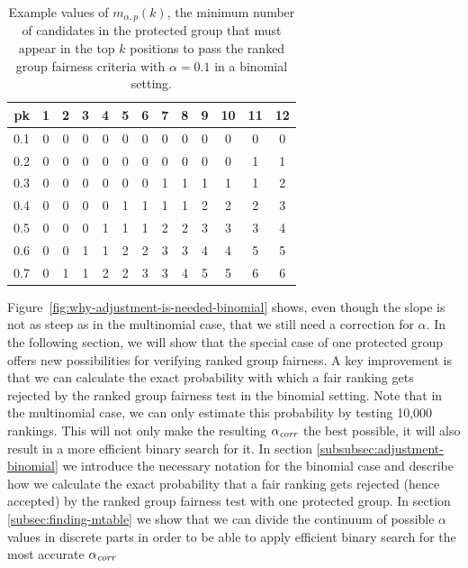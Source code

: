 \begin{table}[t!]
	\caption{Example values of $m_{\alpha,p}(k)$, the minimum number of candidates in the protected group that must appear in the top $k$ positions to pass the ranked group fairness criteria with $\alpha=0.1$ in a binomial setting.}
	\vspace{-3mm}
	\label{tbl:ranked_group_fairness_table}
	\small\begin{tabular}{r|cccccccccccc}
		\diaghead{some text}%
		{p}{k}&
		1 & 2 & 3 & 4 & 5 & 6 & 7 & 8 & 9 & 10 & 11 & 12 \\ \midrule
		0.1      & 0 & 0 & 0 & 0 & 0 & 0 & 0 & 0 & 0 & 0  &  0 &  0 \\
		0.2      & 0 & 0 & 0 & 0 & 0 & 0 & 0 & 0 & 0 & 0  &  1 &  1 \\
		0.3      & 0 & 0 & 0 & 0 & 0 & 0 & 1 & 1 & 1 & 1  &  1 &  2 \\
		0.4      & 0 & 0 & 0 & 0 & 1 & 1 & 1 & 1 & 2 & 2  &  2 &  3 \\
		0.5      & 0 & 0 & 0 & 1 & 1 & 1 & 2 & 2 & 3 & 3  &  3 &  4 \\
		0.6      & 0 & 0 & 1 & 1 & 2 & 2 & 3 & 3 & 4 & 4  &  5 &  5 \\
		0.7      & 0 & 1 & 1 & 2 & 2 & 3 & 3 & 4 & 5 & 5  &  6 &  6 \\
		\bottomrule
	\end{tabular}
\end{table}

Figure~\ref{fig:why-adjustment-is-needed-binomial} shows, even though the slope is not as steep as in the multinomial case, that we still need a correction for $\alpha$.
%
In the following section, we will show that the special case of one protected group offers new possibilities for verifying ranked group fairness. A key improvement is that we can calculate the exact probability with which a fair ranking gets rejected by the ranked group fairness test in the binomial setting. Note that in the multinomial case, we can only estimate this probability by testing 10,000 rankings. This will not only make the resulting $\alpha_\textit{corr}$ the best possible, it will also result in a more efficient binary search for it. 
%
In section \ref{subsubsec:adjustment-binomial} we introduce the necessary notation for the binomial case and describe how we calculate the exact probability that a fair ranking gets rejected (hence accepted) by the ranked group fairness test with one protected group.
In section \ref{subsec:finding-mtable} we show that we can divide the continuum of possible $\alpha$ values in discrete parts in order to be able to apply efficient binary search for the most accurate $\alpha_\textit{corr}$
%
%


